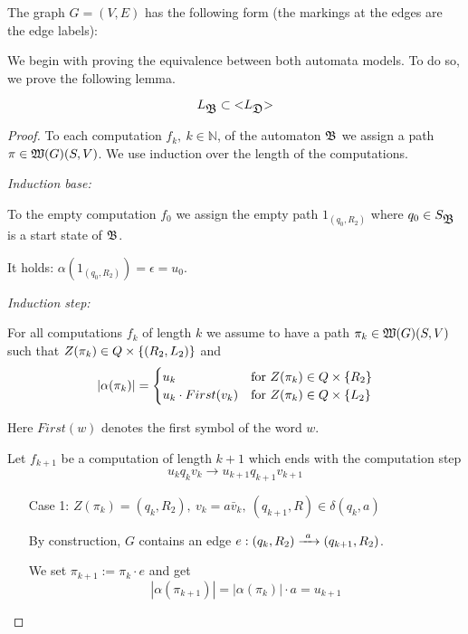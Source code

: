 The graph $G = (V, E)$ has the following form (the markings at the edges are
the edge labels): 

\begin{center}

\end{center}

We begin with proving the equivalence between both automata models. To do so, we
prove the following lemma.

\begin{lemma}
\[ L_{\mbox{$\mathfrak{B}$}} \subset \mbox{${<}{L_{\mbox{$\mathfrak{D}$}}}{>}$} \]
\end{lemma}

\begin{proof}
To each computation $f_k,\ k \in \mathbb{N}$, of the automaton
$\mbox{$\mathfrak{B}$}$ we assign a path $\pi \in \mbox{$\mathfrak{W}({G})$}(S, V)$. We use induction over the
length of the computations.

{\em Induction base:}

To the empty computation $f_0$ we assign the empty path $1_{(q_0, R_2)}$ where
$q_0 \in S_{\mbox{$\mathfrak{B}$}}$ is a start state of $\mbox{$\mathfrak{B}$}$.

It holds: $\alpha(1_{(q_0, R_2)}) = \epsilon = u_0$.

{\em Induction step:}

For all computations $f_k$ of length $k$ we assume to have a path $\pi_k \in
\mbox{$\mathfrak{W}({G})$}(S, V)$ such that $Z(\pi_k) \in Q \times \mbox{$\{(R_2, L_2)\}$}$ and
\[ |\alpha(\pi_k)| = \begin{cases}
u_k & \text{for }Z(\pi_k) \in Q \times \mbox{$\{R_2\}$} \\
u_k \cdot First(v_k) & \text{for }Z(\pi_k) \in Q \times \mbox{$\{L_2\}$}
\end{cases} \]

Here $First(w)$ denotes the first symbol of the word $w$.

Let $f_{k+1}$ be a computation of length $k+1$ which ends with the computation
step
\[ u_k q_k v_k \to u_{k+1} q_{k+1} v_{k+1} \]

\begin{itemize}
  \item[Case 1:] $Z(\pi_k) = (q_k, R_2),\ v_k = a \bar{v}_k,\ (q_{k+1}, R) \in
  \delta(q_k, a)$
  
  By construction, $G$ contains an edge $e: (q_k, R_2) \xrightarrow{\ {a}\ } (q_{k+1}, R_2)$.
  
  We set $\pi_{k+1} := \pi_k \cdot e$ and get
  \[ |\alpha(\pi_{k+1})| = |\alpha(\pi_k)| \cdot a = u_{k+1} \]
  

\end{itemize}
\end{proof}
